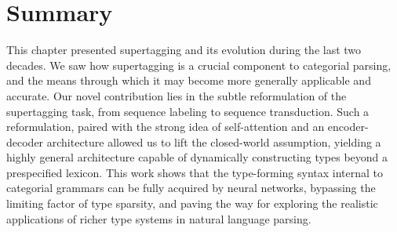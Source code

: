 \section{Summary} 
This chapter presented supertagging and its evolution during the last two decades.
We saw how supertagging is a crucial component to categorial parsing, and the means through which it may become more generally applicable and accurate.
Our novel contribution lies in the subtle reformulation of the supertagging task, from sequence labeling to sequence transduction.
Such a reformulation, paired with the strong idea of self-attention and an encoder-decoder architecture allowed us to lift the closed-world assumption, yielding a highly general architecture capable of dynamically constructing types beyond a prespecified lexicon.
This work shows that the type-forming syntax internal to categorial grammars can be fully acquired by neural networks, bypassing the limiting factor of type sparsity, and paving the way for exploring the realistic applications of richer type systems in natural language parsing.
